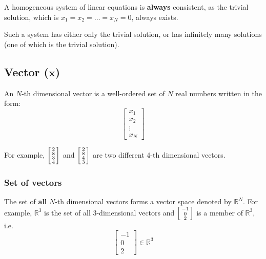 \documentclass[11pt]{article}
\begin{document}
A homogeneous system of linear equations is \textbf{always} consistent, as the trivial solution, which is \(x_1 = x_2 = \ldots = x_N = 0\), always exists.

Such a system has either only the trivial solution, or has infinitely many solutions (one of which is the trivial solution).

\subsection{Vector (\(\boldsymbol{x}\))}
\label{sec:org03c3a95}
An \(N\)-th dimensional vector is a well-ordered set of \(N\) real numbers written in the form:
\begin{displaymath}
\begin{bmatrix}
x_1 \\
x_2 \\
\vdots \\
x_N
\end{bmatrix}
\end{displaymath}

For example,
\begin{math}
\begin{bsmallmatrix}
2 \\
8 \\
3 \\
4
\end{bsmallmatrix}
\end{math}
and
\begin{math}
\begin{bsmallmatrix}
2 \\
8 \\
4 \\
3
\end{bsmallmatrix}
\end{math}
are two different 4-th dimensional vectors.

\subsubsection{Set of vectors}
\label{sec:orgdbb18f7}
The set of \textbf{all} \(N\)-th dimensional vectors forms a vector space denoted by \(\mathbb{R}^N\). For example, \(\mathbb{R}^3\) is the set of all 3-dimensional vectors and
\begin{math}
\begin{bsmallmatrix}
-1 \\
0 \\
2
\end{bsmallmatrix}
\end{math}
is a member of \(\mathbb{R}^3\), i.e.
\begin{displaymath}
\begin{bmatrix}
-1 \\
0 \\
2
\end{bmatrix} \in \mathbb{R}^3
\end{displaymath}
\end{document}
